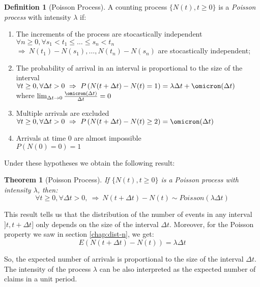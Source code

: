 \documentclass[a4paper, nobind]{templates/ociamthesis}
\newtheorem{theorem}{Theorem}[chapter]
\theoremstyle{definition}
\newtheorem{definition}{Definition}[chapter]
\theoremstyle{definition}
\theoremstyle{definition}
\theoremstyle{remark}
\begin{document}
\begin{definition}[Poisson Process]
\label{def:def-process-poisson} \iffalse (Poisson Process) \fi{} A counting process \(\{N(t), t\ge0\}\) is a \textit{Poisson process} with intensity \(\lambda\) if:

\begin{enumerate}
\item The increments of the process are stocastically independent \\
      $\forall n\ge0, \forall s_1 < t_1 \le \dots \le s_n < t_n$ \\
      $\Rightarrow \ N(t_1)-N(s_1), \dots, N(t_n)-N(s_n)$ are stocastically independent;
\item The probability of arrival in an interval is proportional to the size of the interval \\
      $\forall t\ge 0, \forall \Delta t >0 \ \Rightarrow \ P\left( N(t + \Delta t) - N(t) = 1 \right) = \lambda \Delta t + \omicron (\Delta t)$ \\
      where $\lim_{\Delta t \to 0}{\frac{\omicron(\Delta t)}{\Delta t}} = 0$
\item Multiple arrivals are excluded \\
      $\forall t\ge 0, \forall \Delta t >0 \ \Rightarrow \ P\left( N(t + \Delta t) - N(t) \ge 2 \right) = \omicron (\Delta t)$
\item Arrivals at time $0$ are almost impossible \\
      $P\left( N(0) = 0 \right) = 1 $
\end{enumerate}
\end{definition}

Under these hypotheses we obtain the following result:

\begin{theorem}[Poisson Process]
\label{thm:th-process-poisson} \iffalse (Poisson Process) \fi{} If \(\{N(t), t\ge 0 \}\) is a Poisson process with intensity \(\lambda\), then:
\[\forall t\ge 0, \forall \Delta t >0, \ \Rightarrow \ N(t + \Delta t) - N(t) \sim Poisson(\lambda \Delta t)\]
\end{theorem}

This result tells us that the distribution of the number of events in any interval \(]t, t+\Delta t]\) only depends on the size of the interval \(\Delta t\). Moreover, for the Poisson property we saw in section \ref{chap:dist-n}, we get:
\[E(N(t + \Delta t) - N(t)) = \lambda \Delta t\]

So, the expected number of arrivals is proportional to the size of the interval \(\Delta t\). The intensity of the process \(\lambda\) can be also interpreted as the expected number of claims in a unit period.
\end{document}
